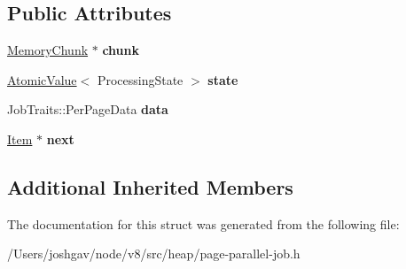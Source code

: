 \subsection*{Public Attributes}
\begin{DoxyCompactItemize}
\item 
\hyperlink{classv8_1_1internal_1_1_memory_chunk}{Memory\+Chunk} $\ast$ {\bfseries chunk}\hypertarget{structv8_1_1internal_1_1_page_parallel_job_1_1_item_a9f47c7114b9115fe85a68acc562d9a6e}{}\label{structv8_1_1internal_1_1_page_parallel_job_1_1_item_a9f47c7114b9115fe85a68acc562d9a6e}

\item 
\hyperlink{classv8_1_1internal_1_1_atomic_value}{Atomic\+Value}$<$ Processing\+State $>$ {\bfseries state}\hypertarget{structv8_1_1internal_1_1_page_parallel_job_1_1_item_a50c306f61ea096917af30ddaed66ee8a}{}\label{structv8_1_1internal_1_1_page_parallel_job_1_1_item_a50c306f61ea096917af30ddaed66ee8a}

\item 
Job\+Traits\+::\+Per\+Page\+Data {\bfseries data}\hypertarget{structv8_1_1internal_1_1_page_parallel_job_1_1_item_a70ffa6ae2a4702d3b875da67f565f5de}{}\label{structv8_1_1internal_1_1_page_parallel_job_1_1_item_a70ffa6ae2a4702d3b875da67f565f5de}

\item 
\hyperlink{structv8_1_1internal_1_1_page_parallel_job_1_1_item}{Item} $\ast$ {\bfseries next}\hypertarget{structv8_1_1internal_1_1_page_parallel_job_1_1_item_ad955006f9056d39997c88532ab66bbe2}{}\label{structv8_1_1internal_1_1_page_parallel_job_1_1_item_ad955006f9056d39997c88532ab66bbe2}

\end{DoxyCompactItemize}
\subsection*{Additional Inherited Members}


The documentation for this struct was generated from the following file\+:\begin{DoxyCompactItemize}
\item 
/\+Users/joshgav/node/v8/src/heap/page-\/parallel-\/job.\+h\end{DoxyCompactItemize}

